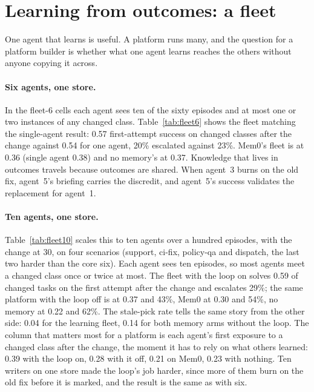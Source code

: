 \documentclass[11pt]{article}
\begin{document}
\section{Learning from outcomes: a fleet}
\label{sec:scale}

One agent that learns is useful. A platform runs many, and the question for a platform builder
is whether what one agent learns reaches the others without anyone copying it across.

\paragraph{Six agents, one store.} In the fleet-6 cells each agent sees ten of the sixty
episodes and at most one or two instances of any changed class. Table~\ref{tab:fleet6} shows
the fleet matching the single-agent result: 0.57 first-attempt success on changed classes
after the change against 0.54 for one agent, 20\% escalated against 23\%. Mem0's fleet is at
0.36 (single agent 0.38) and no memory's at 0.37. Knowledge that lives in outcomes travels
because outcomes are shared. When agent~3 burns on the old fix, agent~5's briefing carries the
discredit, and agent~5's success validates the replacement for agent~1.

\paragraph{Ten agents, one store.} Table~\ref{tab:fleet10} scales this to ten agents over a
hundred episodes, with the change at 30, on four scenarios (support, ci-fix, policy-qa and
dispatch, the last two harder than the core six). Each agent sees ten episodes, so most agents
meet a changed class once or twice at most. The fleet with the loop on solves 0.59 of changed
tasks on the first attempt after the change and escalates 29\%; the same platform with the loop
off is at 0.37 and 43\%, Mem0 at 0.30 and 54\%, no memory at 0.22 and 62\%. The stale-pick
rate tells the same story from the other side: 0.04 for the learning fleet, 0.14 for both
memory arms without the loop. The column that matters most for a platform is each agent's
first exposure to a changed class after the change, the moment it has to rely on what others
learned: 0.39 with the loop on, 0.28 with it off, 0.21 on Mem0, 0.23 with nothing. Ten writers
on one store made the loop's job harder, since more of them burn on the old fix before it is
marked, and the result is the same as with six.
\end{document}
